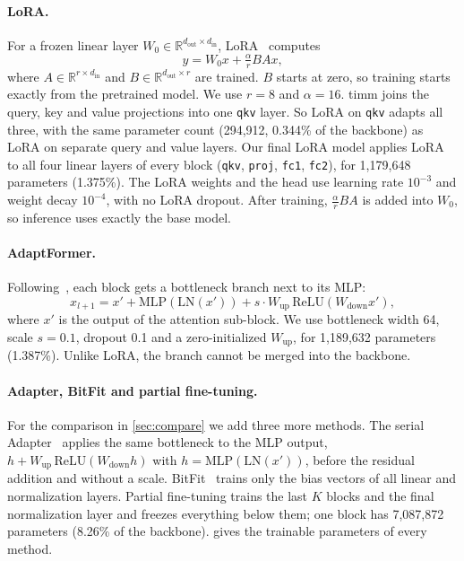 \paragraph{LoRA.}
For a frozen linear layer $W_0 \in \mathbb{R}^{d_\text{out} \times d_\text{in}}$, LoRA~\cite{hu2022lora} computes
\begin{equation}
  y = W_0 x + \tfrac{\alpha}{r} B A x,
  \label{eq:lora}
\end{equation}
where $A \in \mathbb{R}^{r \times d_\text{in}}$ and $B \in \mathbb{R}^{d_\text{out} \times r}$ are trained.
$B$ starts at zero, so training starts exactly from the pretrained model.
We use $r = 8$ and $\alpha = 16$.
timm joins the query, key and value projections into one \texttt{qkv} layer.
So LoRA on \texttt{qkv} adapts all three, with the same parameter count (294,912, 0.344\% of the backbone) as LoRA on separate query and value layers.
Our final LoRA model applies LoRA to all four linear layers of every block (\texttt{qkv}, \texttt{proj}, \texttt{fc1}, \texttt{fc2}), for 1,179,648 parameters (1.375\%).
The LoRA weights and the head use learning rate $10^{-3}$ and weight decay $10^{-4}$, with no LoRA dropout.
After training, $\tfrac{\alpha}{r}BA$ is added into $W_0$, so inference uses exactly the base model.

\paragraph{AdaptFormer.}
Following~\cite{chen2022adaptformer}, each block gets a bottleneck branch next to its MLP:
\begin{equation}
  x_{l+1} = x' + \mathrm{MLP}(\mathrm{LN}(x')) + s \cdot W_\text{up}\,\mathrm{ReLU}(W_\text{down} x'),
  \label{eq:adaptformer}
\end{equation}
where $x'$ is the output of the attention sub-block.
We use bottleneck width 64, scale $s = 0.1$, dropout 0.1 and a zero-initialized $W_\text{up}$, for 1,189,632 parameters (1.387\%).
Unlike LoRA, the branch cannot be merged into the backbone.

\paragraph{Adapter, BitFit and partial fine-tuning.}
For the comparison in \cref{sec:compare} we add three more methods.
The serial Adapter~\cite{houlsby2019adapter} applies the same bottleneck to the MLP output, $h + W_\text{up}\,\mathrm{ReLU}(W_\text{down} h)$ with $h = \mathrm{MLP}(\mathrm{LN}(x'))$, before the residual addition and without a scale.
BitFit~\cite{benzaken2022bitfit} trains only the bias vectors of all linear and normalization layers.
Partial fine-tuning trains the last $K$ blocks and the final normalization layer and freezes everything below them; one block has 7,087,872 parameters (8.26\% of the backbone).
 gives the trainable parameters of every method.

